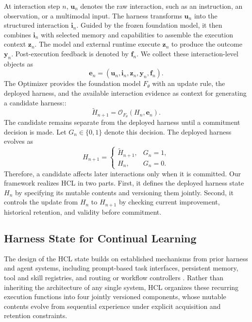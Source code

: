 \documentclass{article}
\begin{document}
At interaction step $n$, $\mathbf{u}_n$ denotes the raw interaction, such as an
instruction, an observation, or a multimodal input. The harness transforms
$\mathbf{u}_n$ into the structured interaction $\mathbf{i}_n$. Guided by the
frozen foundation model, it then combines $\mathbf{i}_n$ with selected memory
and capabilities to assemble the execution context $\mathbf{z}_n$. The model
and external runtime execute $\mathbf{z}_n$ to produce the outcome
$\mathbf{y}_n$. Post-execution feedback is denoted by $\mathbf{f}_n$. We
collect these interaction-level objects as
\begin{equation}
\label{eq:interaction_evidence}
\mathbf{e}_n
=
\left(
\mathbf{u}_n,
\mathbf{i}_n,
\mathbf{z}_n,
\mathbf{y}_n,
\mathbf{f}_n
\right).
\end{equation}
The Optimizer provides the foundation model $F_{\theta}$ with an update rule, the deployed harness, and the available interaction evidence as context for generating a candidate harness::
\begin{equation}
\label{eq:hcl_candidate_transition}
\widetilde{H}_{n+1}
=
\mathcal{O}_{F_{\theta}}
\left(
H_n,
\mathbf{e}_n
\right).
\end{equation}
The candidate remains separate from the deployed harness until a commitment
decision is made. Let $G_n \in \{0,1\}$ denote this decision. The deployed
harness evolves as
\begin{equation}
\label{eq:hcl_general_transition}
H_{n+1}
=
\begin{cases}
\widetilde{H}_{n+1}, & G_n = 1,\\
H_n, & G_n = 0.
\end{cases}
\end{equation}
Therefore, a candidate affects later interactions only when it is committed.
Our framework realizes HCL in two parts. First, it defines the deployed harness state $H_n$ by specifying its mutable contents and versioning them jointly. Second, it controls the update from $H_n$ to ${H}_{n+1}$ by checking current improvement,
historical retention, and validity before commitment.


\subsection{Harness State for Continual Learning}
\label{sec:evolving_state}

The design of the HCL state builds on established mechanisms from prior
harness and agent systems, including prompt-based task interfaces, persistent
memory, tool and skill registries, and routing or workflow controllers
\citep{li2026agentharness,he_harness_2026}. Rather than inheriting the architecture of any single system, HCL organizes
these recurring execution functions into four jointly versioned components, whose mutable contents evolve from sequential experience under explicit acquisition and retention constraints.
\end{document}
